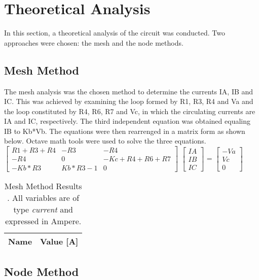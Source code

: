 

\section {Theoretical Analysis}
\label{analysis}

In this section, a theoretical analysis of the circuit was conducted. Two approaches were chosen: the mesh and the node methods.



\subsection{Mesh Method}
The mesh analysis was the chosen method to determine the currents IA, IB and IC. This was achieved by examining the loop formed by R1, R3, R4 and Va and the loop constituted by R4, R6, R7 and Vc, in which the circulating currents are IA and IC, respectively. The third independent equation was obtained equaling IB to Kb*Vb. The equations were then rearrenged in a matrix form as shown below. Octave math tools were used to solve the three equations.\\

$\begin{bmatrix}
R1+R3+R4 & -R3 & -R4\\
   
-R4 & 0 & -Kc+R4+R6+R7\\

-Kb*R3 & Kb*R3-1 & 0
\end{bmatrix}$
$\begin{bmatrix}
IA\\
IB\\
IC
\end{bmatrix}$
= 
$\begin{bmatrix}
-Va\\
Vc\\
0
\end{bmatrix}$

\begin{table}[ht]
  \centering
  \begin{tabular}{|l|r|}
    \hline    
    {\bf Name} & {\bf Value [A]} \\ \hline
    
  \end{tabular}
  \caption{Mesh Method Results . All variables are of type {\em current}
    and expressed in Ampere.}
  \label{tab:malhas}
\end{table}


\subsection{Node Method}

